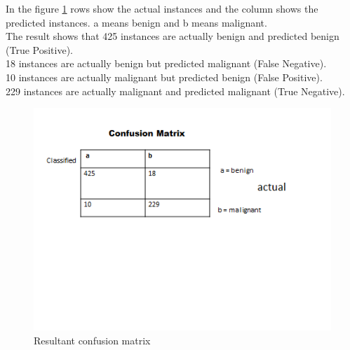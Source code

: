 \documentclass[conference]{IEEEtran}
\begin{document}
In the figure \ref{fig_confusion} rows show the actual instances and the column shows the predicted instances. a means benign and b means malignant. \\The result shows that
 425 instances are actually benign and predicted benign (True Positive).
\\18 instances are actually benign but predicted malignant (False Negative).
\\10 instances are actually malignant but predicted benign (False Positive).
\\229 instances are actually malignant and predicted malignant (True Negative).

\begin{figure}[!h]
\centering
\includegraphics[scale=0.7]{confusion}
\caption{Resultant confusion matrix}
\label{fig_confusion}
\end{figure}

%
%
\end{document}
